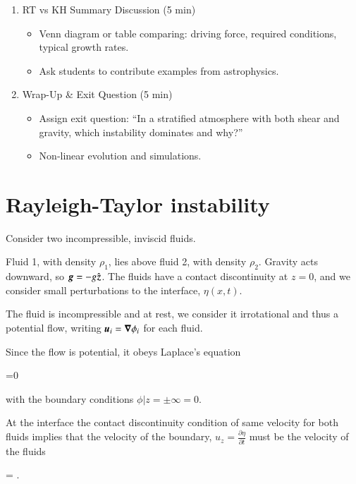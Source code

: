 \begin{itemize}
\begin{enumerate}
    \item RT vs KH Summary Discussion (5 min)
    \begin{itemize}
      \item Venn diagram or table comparing: driving force, required
        conditions, typical growth rates.
      \item Ask students to contribute examples from astrophysics.
      \end{itemize}

    \item Wrap-Up \& Exit Question (5 min)
    \begin{itemize}
      \item Assign exit question: “In a stratified atmosphere with
        both shear and gravity, which instability dominates and why?”
      \item Non-linear evolution and simulations.
      \end{itemize}

    \end{enumerate}
\end{itemize}

\section{Rayleigh-Taylor instability}

Consider two incompressible, inviscid fluids.

Fluid 1, with density $\rho_1$, lies above fluid 2, with density
$\rho_2$. Gravity acts downward, so ${\boldsymbol{g}}=-g\hat{{\boldsymbol{z}}}$. The fluids have a
contact discontinuity at $z=0$, and we consider small perturbations to
the interface, $\eta(x,t)$. 

The fluid is incompressible and at rest, we consider it irrotational
and thus a potential flow, writing ${\boldsymbol{u}}_i ={\boldsymbol{\nabla}}{\phi_i}$ for each
fluid. 

Since the flow is potential, it obeys Laplace's equation

\beq
{}=0
\eeq

\noindent with the boundary conditions $\phi\vert{z=\pm\infty} =  0$. 

At the interface the contact discontinuity condition of same velocity
for both fluids implies that the velocity of the boundary, $u_z =
\frac{\partial \eta}{\partial t}$
must be the velocity of the fluids 

\beq
{} = . 
\label{eq:contactboundary}
\eeq

